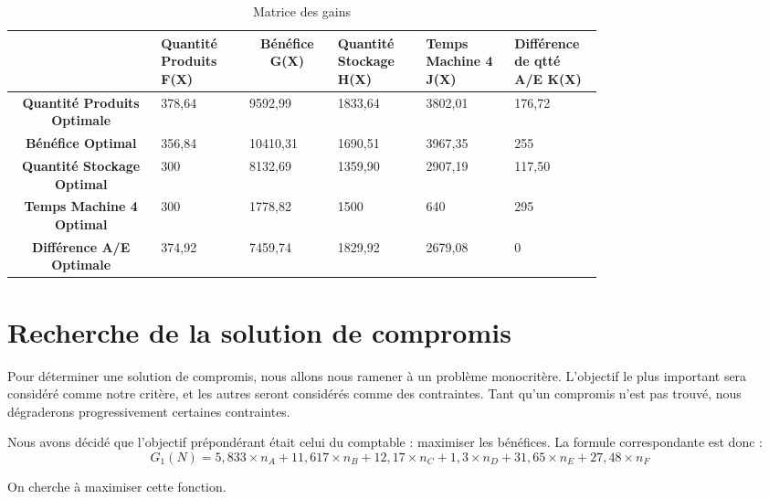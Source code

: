 \documentclass[a4paper,10pt]{article}
\begin{document}
\begin{table}[H]
\centering
\caption{Matrice des gains}
\label{tab:matgain}
\begin{tabular}{c|p{0.15\linewidth}|p{0.15\linewidth}|p{0.15\linewidth}|p{0.15\linewidth}|p{0.15\linewidth}|}
\cline{2-5}
 & \multicolumn{1}{p{0.15\linewidth}|}{\textbf{Quantité Produits F(X)}} & \multicolumn{1}{c|}{\textbf{Bénéfice G(X)}} & \multicolumn{1}{p{0.15\linewidth}|}{\textbf{Quantité Stockage H(X)}} & \multicolumn{1}{p{0.15\linewidth}|}{\textbf{Temps Machine 4 J(X)}} & \multicolumn{1}{p{0.15\linewidth}|}{\textbf{Différence de qtté A/E K(X)}} \\ \hline
\multicolumn{1}{|p{0.15\linewidth}|}{\textbf{Quantité Produits Optimale}} & 378,64 & 9592,99 & 1833,64 & 3802,01 & 176,72 \\ \hline
\multicolumn{1}{|p{0.15\linewidth}|}{\textbf{Bénéfice Optimal}} & 356,84 & 10410,31 & 1690,51 & 3967,35 & 255\\ \hline
\multicolumn{1}{|p{0.15\linewidth}|}{\textbf{Quantité Stockage Optimal}} & 300 & 8132,69 & 1359,90 & 2907,19 & 117,50\\ \hline
\multicolumn{1}{|p{0.15\linewidth}|}{\textbf{Temps Machine 4 Optimal}} & 300 & 1778,82 & 1500 & 640 & 295\\ \hline
\multicolumn{1}{|p{0.15\linewidth}|}{\textbf{Différence A/E Optimale}} & 374,92 & 7459,74 & 1829,92 & 2679,08 & 0\\ \hline

\end{tabular}
\end{table}


\section{Recherche de la solution de compromis}

Pour déterminer une solution de compromis, nous allons nous ramener à un problème monocritère. L'objectif le plus important sera considéré comme notre critère, et les autres seront considérés comme des contraintes. Tant qu'un compromis n'est pas trouvé, nous dégraderons progressivement certaines contraintes.

Nous avons décidé que l'objectif prépondérant était celui du comptable : maximiser les bénéfices. La formule correspondante est donc :
$$G_1(N) = 5,833 \times n_A + 11,617 \times n_B + 12,17 \times n_C + 1,3 \times n_D + 31,65 \times n_E + 27,48 \times n_F$$

On cherche à maximiser cette fonction.
\end{document}
